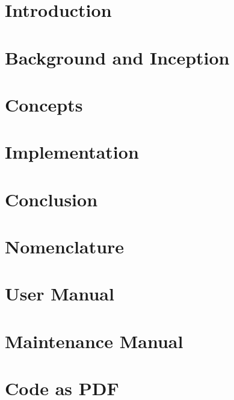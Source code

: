 \documentclass[11pt]{report}
\begin{document}
  
  
  
  
  
  \tableofcontents
  
  \chapter{Introduction}
  \label{cha:intro}
  
    
  
  \chapter{Background and Inception}
  \label{cha:background}
  
    
  
  \chapter{Concepts}
  \label{cha:concepts}
  
    
  
  \chapter{Implementation}
  \label{cha:impl}
  
    
    
  \chapter{Conclusion}
  \label{cha:conc}
  
    
  
  \chapter*{Nomenclature}
  \label{cha:glossary}
  
    
  
  \chapter*{User Manual}
  \label{cha:user}
    
    
  
  \chapter*{Maintenance Manual}
  \label{cha:maint}
  
    
  
  \chapter*{Code as PDF}
  \label{cha:code}
  
  \clearpage
  \nocite{*} %
  
\end{document}
